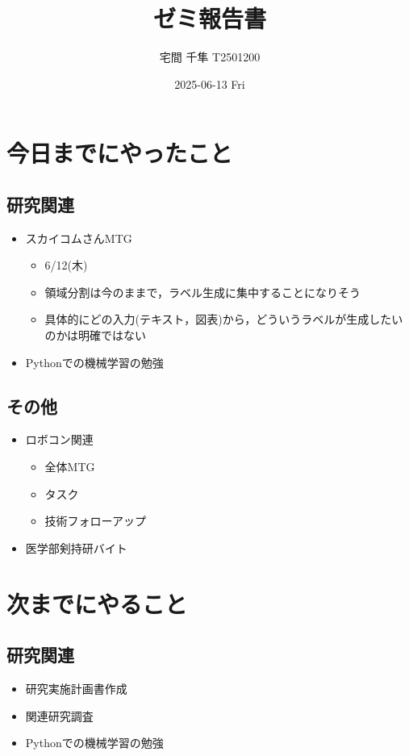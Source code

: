 \documentclass[uplatex, onecolumn, 10pt]{jsarticle}
\begin{document}
\title{\vspace{-40mm}\bf{\LARGE{ゼミ報告書}}}
\author{\vspace{-40mm}宅間 千隼  T2501200}
\date{2025-06-13 Fri}
\maketitle


\section{今日までにやったこと}

\subsection*{研究関連}
\begin{itemize}
	\item スカイコムさんMTG
	\begin{itemize}
        \item 6/12(木)
        \item 領域分割は今のままで，ラベル生成に集中することになりそう
        \item 具体的にどの入力(テキスト，図表)から，どういうラベルが生成したいのかは明確ではない
    \end{itemize}
	\item Pythonでの機械学習の勉強
\end{itemize}

\subsection*{その他}
\begin{itemize}
	\item ロボコン関連
	\begin{itemize}
	    \item 全体MTG
	    \item タスク
	    \item 技術フォローアップ
    \end{itemize}
	\item 医学部剣持研バイト
\end{itemize}



\section{次までにやること}

\subsection*{研究関連}
\begin{itemize}
    \item 研究実施計画書作成
    \item 関連研究調査
	\item Pythonでの機械学習の勉強
\end{itemize}
\end{document}
